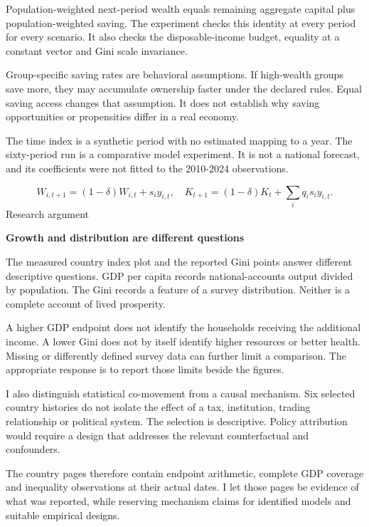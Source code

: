 \documentclass[10pt]{article}
\begin{document}
Population-weighted next-period wealth equals remaining aggregate capital plus population-weighted saving. The experiment checks this identity at every period for every scenario. It also checks the disposable-income budget, equality at a constant vector and Gini scale invariance.\par
Group-specific saving rates are behavioral assumptions. If high-wealth groups save more, they may accumulate ownership faster under the declared rules. Equal saving access changes that assumption. It does not establish why saving opportunities or propensities differ in a real economy.\par
The time index is a synthetic period with no estimated mapping to a year. The sixty-period run is a comparative model experiment. It is not a national forecast, and its coefficients were not fitted to the 2010-2024 observations.\par
\[W_{i,t+1}=(1-\delta)W_{i,t}+s_i y_{i,t},\quad K_{t+1}=(1-\delta)K_t+\sum_iq_i s_i y_{i,t}.\]
\clearpage
{\small\color{accent}Research argument}\par
{\LARGE\bfseries\color{ink}Growth and distribution are different questions}\par\vspace{7pt}
The measured country index plot and the reported Gini points answer different descriptive questions. GDP per capita records national-accounts output divided by population. The Gini records a feature of a survey distribution. Neither is a complete account of lived prosperity.\par
A higher GDP endpoint does not identify the households receiving the additional income. A lower Gini does not by itself identify higher resources or better health. Missing or differently defined survey data can further limit a comparison. The appropriate response is to report those limits beside the figures.\par
I also distinguish statistical co-movement from a causal mechanism. Six selected country histories do not isolate the effect of a tax, institution, trading relationship or political system. The selection is descriptive. Policy attribution would require a design that addresses the relevant counterfactual and confounders.\par
The country pages therefore contain endpoint arithmetic, complete GDP coverage and inequality observations at their actual dates. I let those pages be evidence of what was reported, while reserving mechanism claims for identified models and suitable empirical designs.\par
\end{document}
